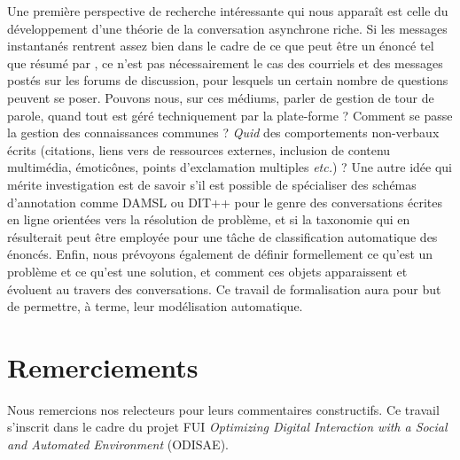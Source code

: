 \documentclass[10pt,a4paper,twoside]{article}
\begin{document}
Une première perspective de recherche intéressante qui nous apparaît est celle du développement d'une théorie de la conversation asynchrone riche. Si les messages instantanés rentrent assez bien dans le cadre de ce que peut être un énoncé tel que résumé par \citet{popescu2005dialogue}, ce n'est pas nécessairement le cas des courriels et des messages postés sur les forums de discussion, pour lesquels un certain nombre de questions peuvent se poser. Pouvons nous, sur ces médiums, parler de gestion de tour de parole, quand tout est géré techniquement par la plate-forme ? Comment se passe la gestion des connaissances communes ? \textit{Quid} des comportements non-verbaux écrits (citations, liens vers de ressources externes, inclusion de contenu multimédia, émoticônes, points d'exclamation multiples \textit{etc.}) ? Une autre idée qui mérite investigation est de savoir s'il est possible de spécialiser des schémas d'annotation comme DAMSL ou DIT++ pour le genre des conversations écrites en ligne orientées vers la résolution de problème, et si la taxonomie qui en résulterait peut être employée pour une tâche de classification automatique des énoncés. Enfin, nous prévoyons également de définir formellement ce qu'est un problème et ce qu'est une solution, et comment ces objets apparaissent et évoluent au travers des conversations. Ce travail de formalisation aura pour but de permettre, à terme, leur modélisation automatique.

\section*{Remerciements}
Nous remercions nos relecteurs pour leurs commentaires constructifs. Ce travail s'inscrit dans le cadre du projet FUI \textit{Optimizing Digital Interaction with a Social and Automated Environment} (ODISAE).




\end{document}
